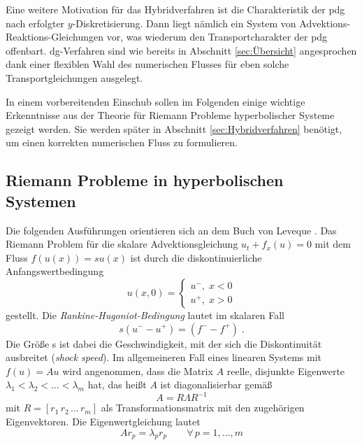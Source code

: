 Eine weitere Motivation für das Hybridverfahren ist die Charakteristik der \ac{pdg} nach erfolgter $y$-Diskretisierung. Dann liegt nämlich ein System von Advektions-Reaktions-Gleichungen vor, was wiederum den Transportcharakter der \ac{pdg} offenbart. \ac{dg}-Verfahren sind wie bereits in Abschnitt \ref{sec:Übersicht} angesprochen dank einer flexiblen Wahl des numerischen Flusses für eben solche Transportgleichungen ausgelegt.

In einem vorbereitenden Einschub sollen im Folgenden einige wichtige Erkenntnisse aus der Theorie für Riemann Probleme hyperbolischer Systeme gezeigt werden. Sie werden später in Abschnitt \ref{sec:Hybridverfahren} benötigt, um einen korrekten numerischen Fluss zu formulieren.

\subsection{Riemann Probleme in hyperbolischen Systemen}\label{sec:riemann}
Die folgenden Ausführungen orientieren sich an dem Buch von Leveque \cite{buchLeveque}.
Das Riemann Problem für die skalare Advektionsgleichung $u_t + f_x(u) = 0$ mit dem Fluss $f(u(x)) = s u(x)$ ist durch die diskontinuierliche Anfangswertbedingung
\begin{equation*}
  u(x,0) = \begin{cases} u^- , \; x < 0 \\
                         u^+ , \; x > 0
           \end{cases}
\end{equation*}
gestellt.  Die \emph{Rankine-Hugoniot-Bedingung} lautet im skalaren Fall
\begin{equation}
  s(u^- - u^+) = (f^- - f^+) \; .
  \label{eq:rhc}
\end{equation}
Die Größe s ist dabei die Geschwindigkeit, mit der sich die Diskontinuität ausbreitet (\emph{shock speed}). Im allgemeineren Fall eines linearen Systems mit $f(u) = A u$ wird angenommen, dass die Matrix $A$ reelle, disjunkte Eigenwerte $\lambda_1 < \lambda_2 < \dots < \lambda_m$ hat, das heißt $A$ ist diagonalisierbar gemäß
\begin{equation*}
  A = R \Lambda R^{-1}
\end{equation*}
mit $R=[r_1 \, r_2 \, \dots \, r_m]$ als Transformationsmatrix mit den zugehörigen Eigenvektoren. Die Eigenwertgleichung lautet
\begin{equation}
  Ar_p = \lambda_p r_p \qquad \forall \, p=1,\dots, m
  \label{eq:EWeq_A}
\end{equation}
